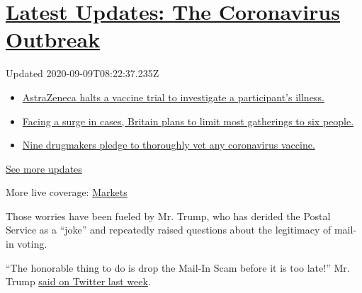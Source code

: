 \hypertarget{latest-updates-the-coronavirus-outbreak}{%
\section{\texorpdfstring{\href{https://www.nytimes3xbfgragh.onion/2020/09/08/world/covid-19-coronavirus.html?action=click\&pgtype=Article\&state=default\&region=MAIN_CONTENT_1\&context=storylines_live_updates}{Latest
Updates: The Coronavirus
Outbreak}}{Latest Updates: The Coronavirus Outbreak}}\label{latest-updates-the-coronavirus-outbreak}}

Updated 2020-09-09T08:22:37.235Z

\begin{itemize}
\tightlist
\item
  \href{https://www.nytimes3xbfgragh.onion/2020/09/08/world/covid-19-coronavirus.html?action=click\&pgtype=Article\&state=default\&region=MAIN_CONTENT_1\&context=storylines_live_updates\#link-313b443d}{AstraZeneca
  halts a vaccine trial to investigate a participant's illness.}
\item
  \href{https://www.nytimes3xbfgragh.onion/2020/09/08/world/covid-19-coronavirus.html?action=click\&pgtype=Article\&state=default\&region=MAIN_CONTENT_1\&context=storylines_live_updates\#link-4438dd7}{Facing
  a surge in cases, Britain plans to limit most gatherings to six
  people.}
\item
  \href{https://www.nytimes3xbfgragh.onion/2020/09/08/world/covid-19-coronavirus.html?action=click\&pgtype=Article\&state=default\&region=MAIN_CONTENT_1\&context=storylines_live_updates\#link-679303d7}{Nine
  drugmakers pledge to thoroughly vet any coronavirus vaccine.}
\end{itemize}

\href{https://www.nytimes3xbfgragh.onion/2020/09/08/world/covid-19-coronavirus.html?action=click\&pgtype=Article\&state=default\&region=MAIN_CONTENT_1\&context=storylines_live_updates}{See
more updates}

More live coverage:
\href{https://www.nytimes3xbfgragh.onion/live/2020/09/08/business/stock-market-today-coronavirus?action=click\&pgtype=Article\&state=default\&region=MAIN_CONTENT_1\&context=storylines_live_updates}{Markets}

Those worries have been fueled by Mr. Trump, who has derided the Postal
Service as a ``joke'' and repeatedly raised questions about the
legitimacy of mail-in voting.

``The honorable thing to do is drop the Mail-In Scam before it is too
late!'' Mr. Trump
\href{https://twitter.com/realdonaldtrump/status/1294731591030378497}{said
on Twitter last week}.

